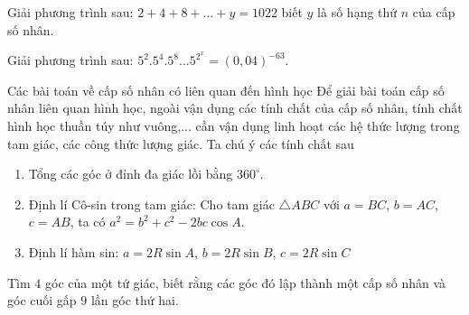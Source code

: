 \begin{bt}%
Giải phương trình sau: $2+4+8+... +y=1022$ biết $y$ là số hạng thứ $n$ của cấp số nhân. 
\end{bt}
\begin{bt}%
	Giải phương trình sau: $5^2.{5}^4.{5}^8... {5}^{{2^x}}={(0,04)}^{-63}$. 
\end{bt}
\newpage
\begin{dang}{Các bài toán về cấp số nhân có liên quan đến hình học}
Để giải bài toán cấp số nhân liên quan hình học, ngoài vận dụng các tính chất của cấp số nhân, tính chất hình học thuần túy như vuông,... cần vận dụng linh hoạt các hệ thức lượng trong tam giác, các công thức lượng giác. Ta chú ý các tính chất sau
\begin{enumerate}
	\item Tổng các góc ở đỉnh đa giác lồi bằng $360^ \circ$.
	\item Định lí Cô-sin trong tam giác: Cho tam giác $ \triangle ABC$ với $a= BC$, $b=AC$, $c=AB$, ta có $a^2=b^2+c^2-2bc \cos A$.
	\item Định lí hàm sin: $a=2R \sin A$, $b= 2R \sin B$, $c=2R \sin C$  
\end{enumerate}
\end{dang}

\begin{vd}%
	Tìm  $4$   góc của một tứ giác, biết rằng các góc đó lập thành một cấp số nhân và góc cuối gấp  $9$   lần góc thứ hai.
\end{vd}

